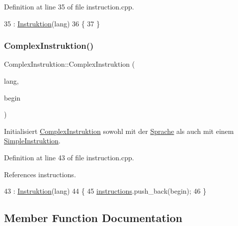 Definition at line 35 of file instruction.\+cpp.


\begin{DoxyCode}
35                                                      : \mbox{\hyperlink{class_instruktion_a26d54febd2022c7402a22a8b55ba097a}{Instruktion}}(lang)
36 \{
37 \}
\end{DoxyCode}
\mbox{\label{class_complex_instruktion_a781aafaec2554b759f887f2667272f06}} 
\subsubsection{\texorpdfstring{Complex\+Instruktion()}{ComplexInstruktion()}\hspace{0.1cm}{\footnotesize\ttfamily [2/2]}}
{\footnotesize\ttfamily Complex\+Instruktion\+::\+Complex\+Instruktion (\begin{DoxyParamCaption}\item[{std\+::string}]{lang,  }\item[{\mbox{\hyperlink{class_simple_instruktion}{Simple\+Instruktion}} \&}]{begin }\end{DoxyParamCaption})}

Initialisiert \mbox{\hyperlink{class_complex_instruktion}{Complex\+Instruktion}} sowohl mit der \mbox{\hyperlink{class_sprache}{Sprache}} als auch mit einem \mbox{\hyperlink{class_simple_instruktion}{Simple\+Instruktion}}. 

Definition at line 43 of file instruction.\+cpp.



References instructions.


\begin{DoxyCode}
43                                                                                : 
      \mbox{\hyperlink{class_instruktion_a26d54febd2022c7402a22a8b55ba097a}{Instruktion}}(lang)
44 \{
45     \mbox{\hyperlink{class_complex_instruktion_af8a7ed862ee24675b75750a470dcf22a}{instructions}}.push\_back(begin);
46 \}
\end{DoxyCode}


\subsection{Member Function Documentation}
\mbox{\label{class_complex_instruktion_ae92fcdd92e0328d4eed826dea81b8c9c}} 
